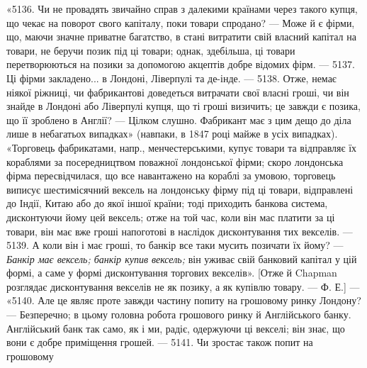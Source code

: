 «5136. Чи не провадять звичайно справ з далекими країнами через такого
купця, що чекає на поворот свого капіталу, поки товари спродано? — Може й
є фірми, що, маючи значне приватне багатство, в стані витратити свій власний
капітал на товари, не беручи позик під ці товари; однак, здебільша, ці товари
перетворюються на позики за допомогою акцептів добре відомих фірм. — 5137.
Ці фірми закладено... в Лондоні, Ліверпулі та де-інде. — 5138. Отже, немає ніякої
ріжниці, чи фабрикантові доведеться витрачати свої власні гроші, чи він знайде
в Лондоні або Ліверпулі купця, що ті гроші визичить; це завжди є позика, що
її зроблено в Англії? — Цілком слушно. Фабрикант має з цим дещо до діла лише
в небагатьох випадках» (навпаки, в 1847 році майже в усіх випадках). «Торговець
фабрикатами, напр., менчестерськими, купує товари та відправляє їх
кораблями за посередництвом поважної лондонської фірми; скоро лондонська фірма
пересвідчилася, що все навантажено на кораблі за умовою, торговець виписує
шестимісячний вексель на лондонську фірму під ці товари, відправлені до Індії,
Китаю або до якої іншої країни; тоді приходить банкова система, дисконтуючи
йому цей вексель; отже на той час, коли він мас платити за ці товари, він
має вже гроші напоготові в наслідок дисконтування тих векселів. — 5139. А коли
він і має гроші, то банкір все таки мусить позичати їх йому? — \emph{Банкір має
вексель; банкір купив вексель;} він уживає свій банковий капітал у цій формі,
а саме у формі дисконтування торгових векселів». [Отже й Chapman розглядає
дисконтування векселів не як позику, а як купівлю товару. — Ф. Е.] — «5140.
Але це являє проте завжди частину попиту на грошовому ринку Лондону? —
Безперечно; в цьому головна робота грошового ринку й Англійського банку.
Англійський банк так само, як і ми, радіє, одержуючи ці векселі; він знає, що
вони є добре приміщення грошей. — 5141. Чи зростає також попит на грошовому
\parbreak{}  %
